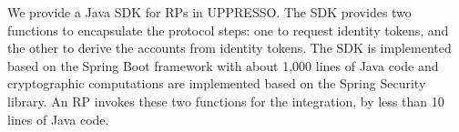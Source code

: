 


We provide a Java SDK for RPs in UPPRESSO.
The SDK provides two functions to encapsulate the protocol steps:
 one to request identity tokens,
    and the other to derive the accounts from identity tokens.
The SDK is implemented based on the Spring Boot framework  with about 1,000 lines of Java code
 and cryptographic computations are implemented based on the Spring Security library.
An RP invokes these two functions for the integration,
    by less than 10 lines of Java code.


